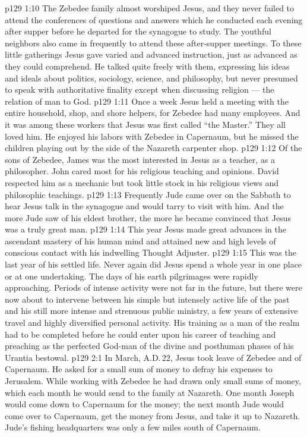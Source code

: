 \vs p129 1:10 The Zebedee family almost worshiped Jesus, and they never failed to attend the conferences of questions and answers which he conducted each evening after supper before he departed for the synagogue to study. The youthful neighbors also came in frequently to attend these after\hyp{}supper meetings. To these little gatherings Jesus gave varied and advanced instruction, just as advanced as they could comprehend. He talked quite freely with them, expressing his ideas and ideals about politics, sociology, science, and philosophy, but never presumed to speak with authoritative finality except when discussing religion --- the relation of man to God.
\vs p129 1:11 Once a week Jesus held a meeting with the entire household, shop, and shore helpers, for Zebedee had many employees. And it was among these workers that Jesus was first called “the Master.” They all loved him. He enjoyed his labors with Zebedee in Capernaum, but he missed the children playing out by the side of the Nazareth carpenter shop.
\vs p129 1:12 Of the sons of Zebedee, James was the most interested in Jesus as a teacher, as a philosopher. John cared most for his religious teaching and opinions. David respected him as a mechanic but took little stock in his religious views and philosophic teachings.
\vs p129 1:13 Frequently Jude came over on the Sabbath to hear Jesus talk in the synagogue and would tarry to visit with him. And the more Jude saw of his eldest brother, the more he became convinced that Jesus was a truly great man.
\vs p129 1:14 \pc This year Jesus made great advances in the ascendant mastery of his human mind and attained new and high levels of conscious contact with his indwelling Thought Adjuster.
\vs p129 1:15 This was the last year of his settled life. Never again did Jesus spend a whole year in one place or at one undertaking. The days of his earth pilgrimages were rapidly approaching. Periods of intense activity were not far in the future, but there were now about to intervene between his simple but intensely active life of the past and his still more intense and strenuous public ministry, a few years of extensive travel and highly diversified personal activity. His training as a man of the realm had to be completed before he could enter upon his career of teaching and preaching as the perfected God\hyp{}man of the divine and posthuman phases of his Urantia bestowal.
\vs p129 2:1 In March, A.D.\,22, Jesus took leave of Zebedee and of Capernaum. He asked for a small sum of money to defray his expenses to Jerusalem. While working with Zebedee he had drawn only small sums of money, which each month he would send to the family at Nazareth. One month Joseph would come down to Capernaum for the money; the next month Jude would come over to Capernaum, get the money from Jesus, and take it up to Nazareth. Jude’s fishing headquarters was only a few miles south of Capernaum.
